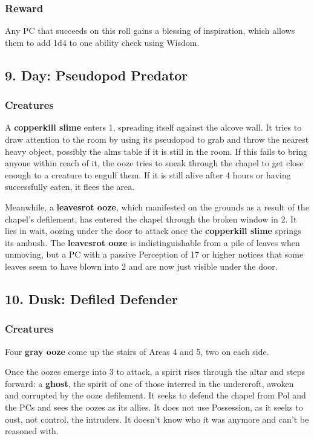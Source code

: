 \documentclass[10pt,a4paper,twoside,bg=print,twocolumn,openany,nodeprecatedcode]{dndbook}
\begin{document}
\subsubsection{Reward}
Any PC that succeeds on this roll gains a blessing of inspiration, which allows them to add 1d4 to one ability check using Wisdom.

\subsection{9. Day: Pseudopod Predator}
\subsubsection{Creatures}
A \textbf{copperkill slime} enters 1, spreading itself against the alcove wall. It tries to draw attention to the room by using its pseudopod to grab and throw the nearest heavy object, possibly the alms table if it is still in the room. If this fails to bring anyone within reach of it, the ooze tries to sneak through the chapel to get close enough to a creature to engulf them. If it is still alive after 4 hours or having successfully eaten, it flees the area.

Meanwhile, a \textbf{leavesrot ooze}, which manifested on the grounds as a result of the chapel's defilement, has entered the chapel through the broken window in 2. It lies in wait, oozing under the door to attack once the \textbf{copperkill slime} springs its ambush. The \textbf{leavesrot ooze} is indistinguishable from a pile of leaves when unmoving, but a PC with a passive Perception of 17 or higher notices that some leaves seem to have blown into 2 and are now just visible under the door.

\subsection{10. Dusk: Defiled Defender}
\subsubsection{Creatures}
Four \textbf{gray ooze} come up the stairs of Areas 4 and 5, two on each side.

Once the oozes emerge into 3 to attack, a spirit rises through the altar and steps forward: a \textbf{ghost}, the spirit of one of those interred in the undercroft, awoken and corrupted by the ooze defilement. It seeks to defend the chapel from Pol and the PCs and sees the oozes as its allies. It does not use Possession, as it seeks to oust, not control, the intruders. It doesn't know who it was anymore and can't be reasoned with.
\end{document}
